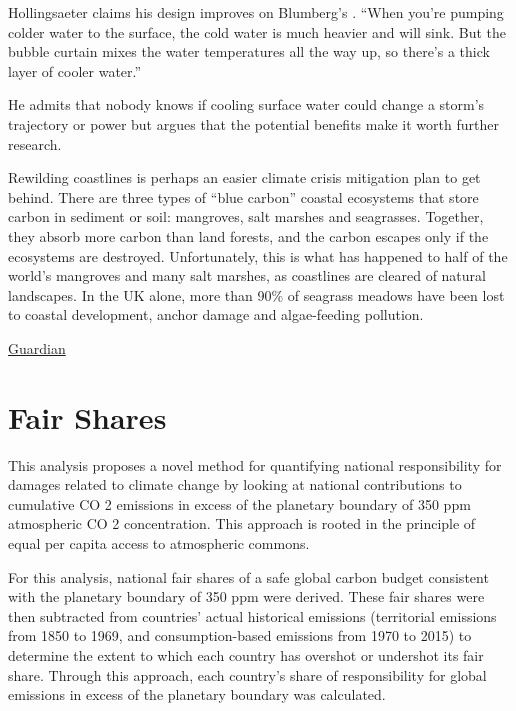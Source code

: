 \documentclass[
]{book}
\begin{document}
Hollingsaeter claims his design improves on Blumberg's . ``When you're pumping colder water to the surface, the cold water is much heavier and will sink. But the bubble curtain mixes the water temperatures all the way up, so there's a thick layer of cooler water.''

He admits that nobody knows if cooling surface water could change a storm's trajectory or power but argues that the potential benefits make it worth further research.

Rewilding coastlines is perhaps an easier climate crisis mitigation plan to get behind. There are three types of ``blue carbon'' coastal ecosystems that store carbon in sediment or soil: mangroves, salt marshes and seagrasses. Together, they absorb more carbon than land forests, and the carbon escapes only if the ecosystems are destroyed.
Unfortunately, this is what has happened to half of the world's mangroves and many salt marshes, as coastlines are cleared of natural landscapes. In the UK alone, more than 90\% of seagrass meadows have been lost to coastal development, anchor damage and algae-feeding pollution.

\href{https://www.theguardian.com/environment/2021/jun/23/cloud-spraying-and-hurricane-slaying-could-geoengineering-fix-the-climate-crisis}{Guardian}

\hypertarget{fair-shares}{%
\chapter{Fair Shares}\label{fair-shares}}

This analysis proposes a novel method for quantifying national responsibility for damages related to
climate change by looking at national contributions to cumulative CO 2 emissions in excess of the planetary boundary
of 350 ppm atmospheric CO 2 concentration. This approach is rooted in the principle of equal per capita access to
atmospheric commons.

For this analysis, national fair shares of a safe global carbon budget consistent with the planetary boundary
of 350 ppm were derived. These fair shares were then subtracted from countries' actual historical emissions (territorial
emissions from 1850 to 1969, and consumption-based emissions from 1970 to 2015) to determine the extent to which
each country has overshot or undershot its fair share. Through this approach, each country's share of responsibility
for global emissions in excess of the planetary boundary was calculated.
\end{document}
